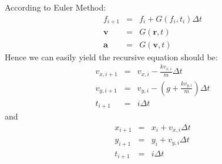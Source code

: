 \documentclass{article}
\begin{document}
\subsection{}
According to Euler Method:
\begin{eqnarray*}
f_{i+1} & = & f_i+G(f_i,t_i)\Delta t\\
\mathbf{v} & = & G(\mathbf{r},t)\\
\mathbf{a} & = & G(\mathbf{v},t)
\end{eqnarray*}
Hence we can easily yield the recursive equation should be:
\begin{eqnarray*}
v_{x,i+1}&=& v_{x,i}-\frac{kv_{x,i}}{m}\Delta t\\
v_{y,i+1}&=& v_{y,i}-(g+\frac{kv_{y,i}}{m})\Delta t\\
t_{i+1}&=& i\Delta t
\end{eqnarray*}
and
\begin{eqnarray*}
x_{i+1} &=& x_i+v_{x,i}\Delta t\\
y_{i+1} &=& y_i+v_{y,i}\Delta t\\
t_{i+1} &=& i\Delta t
\end{eqnarray*}
\end{document}
